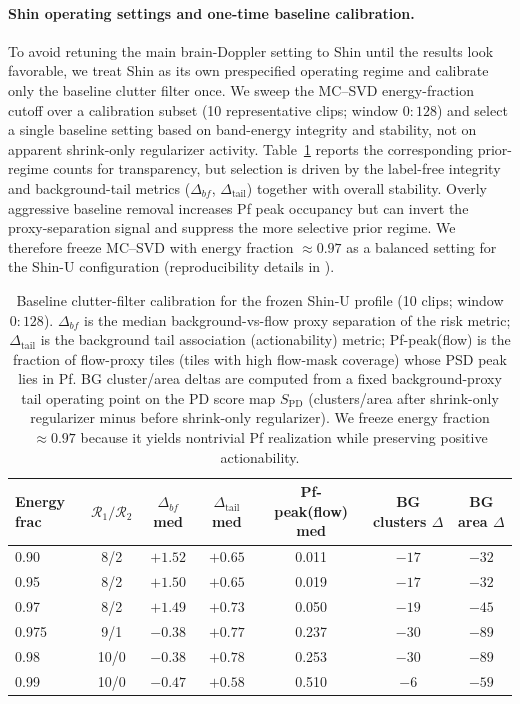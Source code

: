 \paragraph{Shin operating settings and one-time baseline calibration.}
To avoid retuning the main brain-Doppler setting to Shin until the results look favorable, we treat Shin as its own prespecified operating regime and calibrate only the baseline clutter filter once. We sweep the MC--SVD energy-fraction cutoff over a calibration subset (10 representative clips; window $0{:}128$) and select a single baseline setting based on band-energy integrity and stability, not on apparent shrink-only regularizer activity. Table~\ref{tab:shin_baseline_sweep} reports the corresponding prior-regime counts for transparency, but selection is driven by the label-free integrity and background-tail metrics ($\Delta_{bf}$, $\Delta_{\mathrm{tail}}$) together with overall stability. Overly aggressive baseline removal increases Pf peak occupancy but can invert the proxy-separation signal and suppress the more selective prior regime. We therefore freeze MC--SVD with energy fraction $\approx 0.97$ as a balanced setting for the Shin-U configuration (reproducibility details in ).

\begin{table}[t]
\centering
\small
\begin{tabular}{lcccccc}
\hline
Energy frac & $\mathcal{R}_1/\mathcal{R}_2$ & $\Delta_{bf}$ med & $\Delta_{\mathrm{tail}}$ med & Pf-peak(flow) med & BG clusters $\Delta$ & BG area $\Delta$ \\
\hline
0.90 & 8/2 & $+1.52$ & $+0.65$ & 0.011 & $-17$ & $-32$ \\
0.95 & 8/2 & $+1.50$ & $+0.65$ & 0.019 & $-17$ & $-32$ \\
0.97 & 8/2 & $+1.49$ & $+0.73$ & 0.050 & $-19$ & $-45$ \\
0.975 & 9/1 & $-0.38$ & $+0.77$ & 0.237 & $-30$ & $-89$ \\
0.98 & 10/0 & $-0.38$ & $+0.78$ & 0.253 & $-30$ & $-89$ \\
0.99 & 10/0 & $-0.47$ & $+0.58$ & 0.510 & $-6$ & $-59$ \\
\hline
\end{tabular}
\caption{Baseline clutter-filter calibration for the frozen Shin-U profile (10 clips; window $0{:}128$). $\Delta_{bf}$ is the median background-vs-flow proxy separation of the risk metric; $\Delta_{\mathrm{tail}}$ is the background tail association (actionability) metric; Pf-peak(flow) is the fraction of flow-proxy tiles (tiles with high flow-mask coverage) whose PSD peak lies in Pf. BG cluster/area deltas are computed from a fixed background-proxy tail operating point on the PD score map $S_{\mathrm{PD}}$ (clusters/area after shrink-only regularizer minus before shrink-only regularizer). We freeze energy fraction $\approx 0.97$ because it yields nontrivial Pf realization while preserving positive actionability.}
\label{tab:shin_baseline_sweep}
\end{table}

